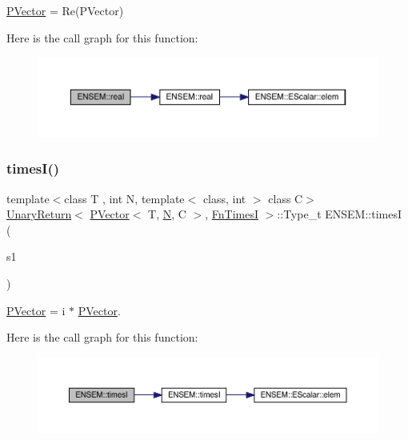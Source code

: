\mbox{\hyperlink{classENSEM_1_1PVector}{P\+Vector}} = Re(\+P\+Vector) 

Here is the call graph for this function\+:\nopagebreak
\begin{figure}[H]
\begin{center}
\leavevmode
\includegraphics[width=350pt]{d3/dc4/group__primvector_ga9198795b4cc43e6d68f0273dd10b3aa1_cgraph}
\end{center}
\end{figure}
\mbox{\label{group__primvector_ga0c6f467326b48a0fafa4b42ce712d0c1}} 
\subsubsection{\texorpdfstring{timesI()}{timesI()}}
{\footnotesize\ttfamily template$<$class T , int N, template$<$ class, int $>$ class C$>$ \\
\mbox{\hyperlink{structENSEM_1_1UnaryReturn}{Unary\+Return}}$<$ \mbox{\hyperlink{classENSEM_1_1PVector}{P\+Vector}}$<$ T, \mbox{\hyperlink{operator__name__util_8cc_a7722c8ecbb62d99aee7ce68b1752f337}{N}}, C $>$, \mbox{\hyperlink{structENSEM_1_1FnTimesI}{Fn\+TimesI}} $>$\+::Type\+\_\+t E\+N\+S\+E\+M\+::timesI (\begin{DoxyParamCaption}\item[{const \mbox{\hyperlink{classENSEM_1_1PVector}{P\+Vector}}$<$ T, \mbox{\hyperlink{operator__name__util_8cc_a7722c8ecbb62d99aee7ce68b1752f337}{N}}, C $>$ \&}]{s1 }\end{DoxyParamCaption})\hspace{0.3cm}{\ttfamily [inline]}}



\mbox{\hyperlink{classENSEM_1_1PVector}{P\+Vector}} = i $\ast$ \mbox{\hyperlink{classENSEM_1_1PVector}{P\+Vector}}. 

Here is the call graph for this function\+:\nopagebreak
\begin{figure}[H]
\begin{center}
\leavevmode
\includegraphics[width=350pt]{d3/dc4/group__primvector_ga0c6f467326b48a0fafa4b42ce712d0c1_cgraph}
\end{center}
\end{figure}
\mbox{\label{group__primvector_gaa73c49a7eea92a59f41ed2ae3deeab2f}} 
